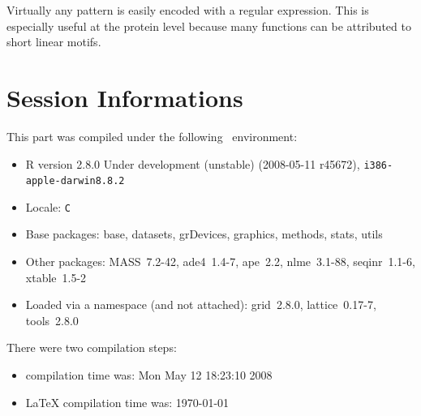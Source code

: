 \documentclass{article}
\begin{document}
Virtually any pattern is easily encoded with a regular expression. This is
especially useful at the protein level because many functions can be attributed 
to short linear motifs.


\section*{Session Informations}

This part was compiled under the following \Rlogo{}~environment:

\begin{itemize}
  \item R version 2.8.0 Under development (unstable) (2008-05-11 r45672), \verb|i386-apple-darwin8.8.2|
  \item Locale: \verb|C|
  \item Base packages: base, datasets, grDevices, graphics, methods,
    stats, utils
  \item Other packages: MASS~7.2-42, ade4~1.4-7, ape~2.2,
    nlme~3.1-88, seqinr~1.1-6, xtable~1.5-2
  \item Loaded via a namespace (and not attached): grid~2.8.0,
    lattice~0.17-7, tools~2.8.0
\end{itemize}
There were two compilation steps:

\begin{itemize}
  \item \Rlogo{} compilation time was: Mon May 12 18:23:10 2008
  \item \LaTeX{} compilation time was: \today
\end{itemize}


\clearpage
{}


\end{document}
